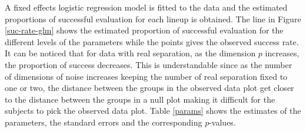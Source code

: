

A fixed effects logistic regression model is fitted to the data and the estimated proportions of successful evaluation for each lineup is obtained.  The line in Figure \ref{suc-rate-glm} shows the estimated proportion of successful evaluation for the different levels of the parameters while the points gives the observed success rate. It can be noticed that for data with real separation, as the dimension $p$ increases, the proportion of success decreases. This is understandable since as the number of dimensions of noise increases keeping the number of real separation fixed to one or two, the distance between the groups in the observed data plot get closer to the distance between the groups in a null plot making it difficult for the subjects to pick the observed data plot. Table \ref{params} shows the estimates of the parameters, the standard errors and the corresponding $p$-values.


